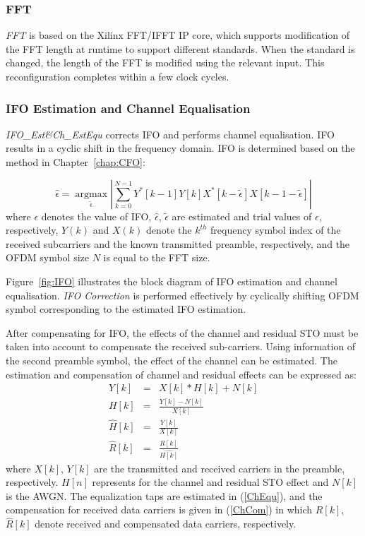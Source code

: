 \subsubsection{FFT}
\emph{FFT} is based on the Xilinx FFT/IFFT IP core, which supports modification of the FFT length at runtime to support different standards. When the standard is changed, the length of the FFT is modified using the relevant input. This reconfiguration completes within a few clock cycles.

\subsubsection{IFO Estimation and Channel Equalisation}
\emph{IFO\_Est\&Ch\_EstEqu} corrects IFO and performs channel equalisation.
IFO results in a cyclic shift in the frequency domain.
IFO is determined based on the method in Chapter~\ref{chap:CFO}:

\begin{equation}
\label{integerCFO}
\hat{\epsilon} =\underset{\tilde{\epsilon}}{\operatorname{argmax}}  \left|\sum_{k=0}^{N-1} Y^{*}[k-1] Y[k]  X^{*}[k-\tilde{\epsilon}]  X[k-1-\tilde{\epsilon}]\right|
\end{equation}
where $\epsilon$ denotes the value of IFO, $\hat{\epsilon}$, $\tilde{\epsilon}$ are estimated and trial values of $\epsilon$, respectively,
$Y(k)$ and $X(k)$ denote the $k^{th}$ frequency symbol index of the received subcarriers and the known transmitted preamble, respectively, and the OFDM symbol size $N$ is equal to the FFT size.

Figure~\ref{fig:IFO} illustrates the block diagram of IFO estimation and channel equalisation.
\emph{IFO Correction} is performed effectively by cyclically shifting OFDM symbol corresponding to the estimated IFO estimation.

After compensating for IFO, the effects of the channel and residual STO must be taken into account to compensate the received sub-carriers.
Using information of the second preamble symbol, the effect of the channel can be estimated.
The estimation and compensation of channel and residual effects can be expressed as:
\begin{eqnarray}
\label{ChEqu}
Y[k] &=& X[k] * H[k] + N[k] \nonumber \\
H[k] &=& \frac{Y[k]-N[k]}{X[k]} \nonumber \\
\hat{H}[k] &=& \frac{Y[k]}{X[k]}\\
\label{ChCom}
\hat{R}[k] &=& \frac{R[k]}{\hat{H[k]}}
\end{eqnarray}
where $X[k]$, $Y[k]$ are the transmitted and received carriers in the preamble, respectively.
$H[n]$ represents for the channel and residual STO effect and $N[k]$ is the AWGN.
The equalization taps are estimated in (\ref{ChEqu}), and the compensation for received data carriers is given in (\ref{ChCom})
in which $R[k]$, $\hat{R}[k]$ denote received and compensated data carriers, respectively.

